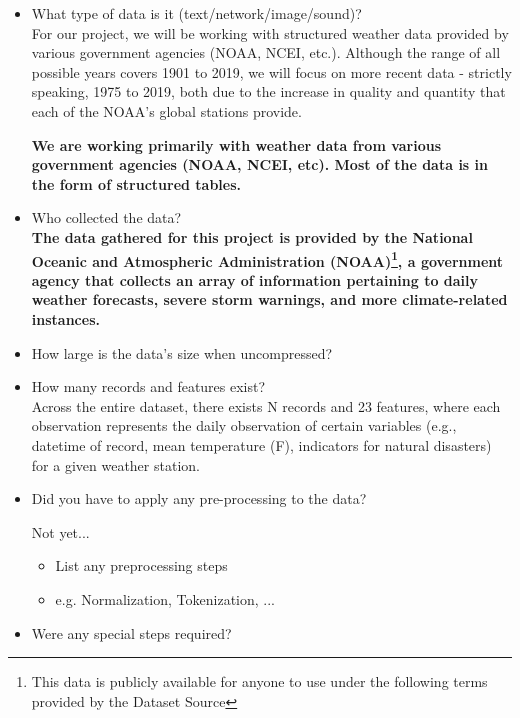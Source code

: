 \documentclass[conference]{IEEEtran}
\begin{document}
\begin{itemize}
  \item What type of data is it (text/network/image/sound)? \\
  
  For our project, we will be working with structured weather data provided by various government agencies (NOAA, NCEI, etc.). Although the range of all possible years covers 1901 to 2019, we will focus on more recent data - strictly speaking, 1975 to 2019, both due to the increase in quality and quantity that each of the NOAA's global stations provide.

  \textbf{We are working primarily with weather data from various government agencies (NOAA, NCEI, etc). Most of the data is in the form of structured tables.} \\

  \item Who collected the data? \\

  \textbf{The data gathered for this project is provided by the National Oceanic and Atmospheric Administration (NOAA)\footnote{This data is publicly available for anyone to use under the following terms provided by the Dataset Source}, a government agency that collects an array of information pertaining to daily weather forecasts, severe storm warnings, and more climate-related instances.} \\

  \item How large is the data's size when uncompressed?
  
  
  
  \item How many records and features exist? \\
  
  Across the entire dataset, there exists N records and 23 features, where each observation represents the daily observation of certain variables (e.g., datetime of record, mean temperature (F), indicators for natural disasters) for a given weather station. \\
  
  \item Did you have to apply any pre-processing to the data?
  
  Not yet...
  
  \begin{itemize}
    \item List any preprocessing steps
    \item e.g. Normalization, Tokenization, ...
  \end{itemize}
  \item Were any special steps required?
  

\end{itemize}
\end{document}
